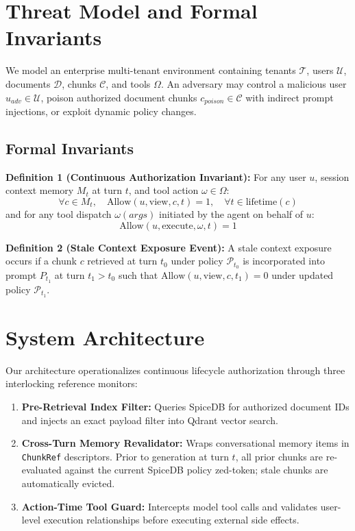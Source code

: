\documentclass[journal,compsoc]{IEEEtran}
\begin{document}


\section{Threat Model and Formal Invariants}
\label{sec:threat_model}

We model an enterprise multi-tenant environment containing tenants $\mathcal{T}$, users $\mathcal{U}$, documents $\mathcal{D}$, chunks $\mathcal{C}$, and tools $\Omega$. An adversary may control a malicious user $u_{adv} \in \mathcal{U}$, poison authorized document chunks $c_{poison} \in \mathcal{C}$ with indirect prompt injections, or exploit dynamic policy changes.

\subsection{Formal Invariants}

\textbf{Definition 1 (Continuous Authorization Invariant):} For any user $u$, session context memory $M_t$ at turn $t$, and tool action $\omega \in \Omega$:
\begin{equation}
\label{eq:continuous_auth}
\forall c \in M_t, \quad \mathrm{Allow}(u, \text{view}, c, t) = 1, \quad \forall t \in \mathrm{lifetime}(c)
\end{equation}
and for any tool dispatch $\omega(args)$ initiated by the agent on behalf of $u$:
\begin{equation}
\label{eq:action_auth}
\mathrm{Allow}(u, \text{execute}, \omega, t) = 1
\end{equation}

\textbf{Definition 2 (Stale Context Exposure Event):} A stale context exposure occurs if a chunk $c$ retrieved at turn $t_0$ under policy $\mathcal{P}_{t_0}$ is incorporated into prompt $P_{t_1}$ at turn $t_1 > t_0$ such that $\mathrm{Allow}(u, \text{view}, c, t_1) = 0$ under updated policy $\mathcal{P}_{t_1}$.

\section{System Architecture}
\label{sec:architecture}

Our architecture operationalizes continuous lifecycle authorization through three interlocking reference monitors:
\begin{enumerate}
    \item \textbf{Pre-Retrieval Index Filter:} Queries SpiceDB for authorized document IDs and injects an exact payload filter into Qdrant vector search.
    \item \textbf{Cross-Turn Memory Revalidator:} Wraps conversational memory items in \texttt{ChunkRef} descriptors. Prior to generation at turn $t$, all prior chunks are re-evaluated against the current SpiceDB policy zed-token; stale chunks are automatically evicted.
    \item \textbf{Action-Time Tool Guard:} Intercepts model tool calls and validates user-level execution relationships before executing external side effects.
\end{enumerate}
\end{document}
